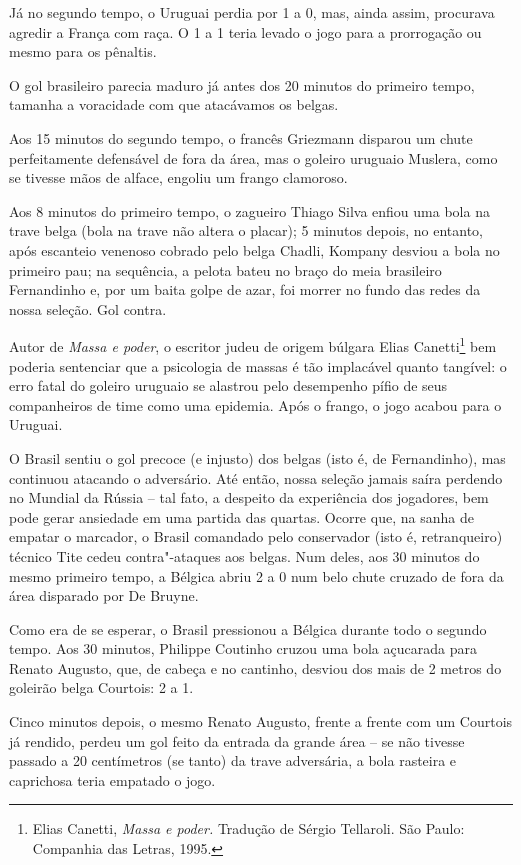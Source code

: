 Já no segundo tempo, o Uruguai perdia por 1 a 0, mas, ainda assim,
procurava agredir a França com raça. O 1 a 1 teria levado o jogo para a
prorrogação ou mesmo para os pênaltis.

O gol brasileiro parecia maduro já antes dos 20 minutos do primeiro
tempo, tamanha a voracidade com que atacávamos os belgas.

Aos 15 minutos do segundo tempo, o francês Griezmann disparou um chute
perfeitamente defensável de fora da área, mas o goleiro uruguaio
Muslera, como se tivesse mãos de alface, engoliu um frango clamoroso.

Aos 8 minutos do primeiro tempo, o zagueiro Thiago Silva enfiou uma bola
na trave belga (bola na trave não altera o placar); 5 minutos depois, no
entanto, após escanteio venenoso cobrado pelo belga Chadli, Kompany
desviou a bola no primeiro pau; na sequência, a pelota bateu no braço do
meia brasileiro Fernandinho e, por um baita golpe de azar, foi morrer no
fundo das redes da nossa seleção. Gol contra.

Autor de \emph{Massa e poder}, o escritor judeu de origem búlgara Elias
Canetti\footnote{Elias Canetti, \emph{Massa e poder.} Tradução de Sérgio
  Tellaroli. São Paulo: Companhia das Letras, 1995.} bem poderia
sentenciar que a psicologia de massas é tão implacável quanto tangível:
o erro fatal do goleiro uruguaio se alastrou pelo desempenho pífio de
seus companheiros de time como uma epidemia. Após o frango, o jogo
acabou para o Uruguai.

O Brasil sentiu o gol precoce (e injusto) dos belgas (isto é, de
Fernandinho), mas continuou atacando o adversário. Até então, nossa
seleção jamais saíra perdendo no Mundial da Rússia -- tal fato, a
despeito da experiência dos jogadores, bem pode gerar ansiedade em uma
partida das quartas. Ocorre que, na sanha de empatar o marcador, o
Brasil comandado pelo conservador (isto é, retranqueiro) técnico Tite
cedeu contra"-ataques aos belgas. Num deles, aos 30 minutos do mesmo
primeiro tempo, a Bélgica abriu 2 a 0 num belo chute cruzado de fora da
área disparado por De Bruyne.

Como era de se esperar, o Brasil pressionou a Bélgica durante todo o
segundo tempo. Aos 30 minutos, Philippe Coutinho cruzou uma bola
açucarada para Renato Augusto, que, de cabeça e no cantinho, desviou dos
mais de 2 metros do goleirão belga Courtois: 2 a 1.

Cinco minutos depois, o mesmo Renato Augusto, frente a frente com um
Courtois já rendido, perdeu um gol feito da entrada da grande área -- se
não tivesse passado a 20 centímetros (se tanto) da trave adversária, a
bola rasteira e caprichosa teria empatado o jogo.

